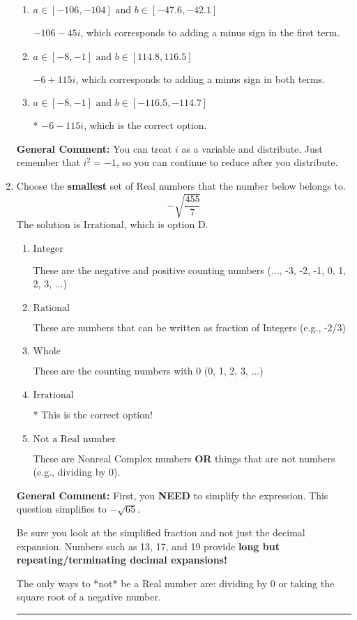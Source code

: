 \documentclass{extbook}[14pt]
\newcommand{\litem}[1]{\item #1

\rule{\textwidth}{0.4pt}}
\begin{document}
\begin{enumerate}
{\begin{enumerate}[label=\Alph*.]
 $-106 + 45 i$, which corresponds to adding a minus sign in the second term.
\item \( a \in [-106, -104] \text{ and } b \in [-47.6, -42.1] \)

 $-106 - 45 i$, which corresponds to adding a minus sign in the first term.
\item \( a \in [-8, -1] \text{ and } b \in [114.8, 116.5] \)

 $-6 + 115 i$, which corresponds to adding a minus sign in both terms.
\item \( a \in [-8, -1] \text{ and } b \in [-116.5, -114.7] \)

* $-6 - 115 i$, which is the correct option.
\end{enumerate}

\textbf{General Comment:} You can treat $i$ as a variable and distribute. Just remember that $i^2=-1$, so you can continue to reduce after you distribute.
}
\litem{
Choose the \textbf{smallest} set of Real numbers that the number below belongs to.
\[ -\sqrt{\frac{455}{7}} \]The solution is \( \text{Irrational} \), which is option D.\begin{enumerate}[label=\Alph*.]
\item \( \text{Integer} \)

These are the negative and positive counting numbers (..., -3, -2, -1, 0, 1, 2, 3, ...)
\item \( \text{Rational} \)

These are numbers that can be written as fraction of Integers (e.g., -2/3)
\item \( \text{Whole} \)

These are the counting numbers with 0 (0, 1, 2, 3, ...)
\item \( \text{Irrational} \)

* This is the correct option!
\item \( \text{Not a Real number} \)

These are Nonreal Complex numbers \textbf{OR} things that are not numbers (e.g., dividing by 0).
\end{enumerate}

\textbf{General Comment:} First, you \textbf{NEED} to simplify the expression. This question simplifies to $-\sqrt{65}$. 
 
 Be sure you look at the simplified fraction and not just the decimal expansion. Numbers such as 13, 17, and 19 provide \textbf{long but repeating/terminating decimal expansions!} 
 
 The only ways to *not* be a Real number are: dividing by 0 or taking the square root of a negative number. 
 
}
\end{enumerate}
\end{document}
